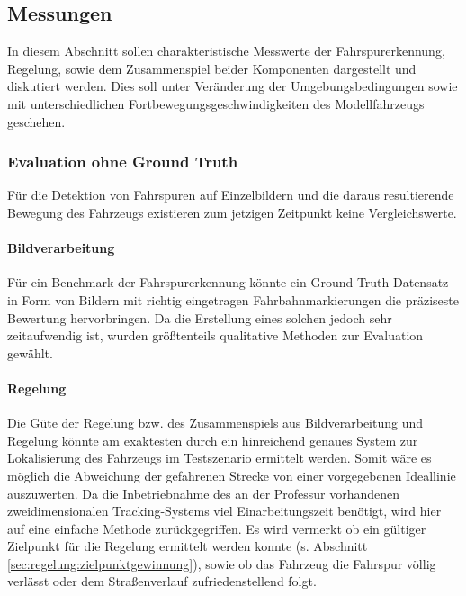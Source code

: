 \subsection{Messungen}
In diesem Abschnitt sollen charakteristische Messwerte der Fahrspurerkennung, Regelung, sowie dem Zusammenspiel beider Komponenten dargestellt und diskutiert werden. Dies soll unter Veränderung der Umgebungsbedingungen sowie mit unterschiedlichen Fortbewegungsgeschwindigkeiten des Modellfahrzeugs geschehen.
  
\subsubsection{Evaluation ohne Ground Truth}
Für die Detektion von Fahrspuren auf Einzelbildern und die daraus resultierende Bewegung des Fahrzeugs existieren zum jetzigen Zeitpunkt keine Vergleichswerte. 

\paragraph{Bildverarbeitung} 
Für ein Benchmark der Fahrspurerkennung könnte ein Ground-Truth-Datensatz in Form von Bildern mit richtig eingetragen Fahrbahnmarkierungen die präziseste Bewertung hervorbringen. Da die Erstellung eines solchen jedoch sehr zeitaufwendig ist, wurden größtenteils qualitative Methoden zur Evaluation gewählt.



\paragraph{Regelung} 
Die Güte der Regelung bzw. des Zusammenspiels aus Bildverarbeitung und Regelung könnte am exaktesten durch ein hinreichend genaues System zur Lokalisierung des Fahrzeugs im Testszenario ermittelt werden. Somit wäre es möglich die Abweichung der gefahrenen Strecke von einer vorgegebenen Ideallinie auszuwerten. Da die Inbetriebnahme des an der Professur vorhandenen zweidimensionalen Tracking-Systems viel Einarbeitungszeit benötigt, wird hier auf eine einfache Methode zurückgegriffen. Es wird vermerkt ob ein gültiger Zielpunkt für die Regelung ermittelt werden konnte (s. Abschnitt \ref{sec:regelung:zielpunktgewinnung}), sowie ob das Fahrzeug die Fahrspur völlig verlässt oder dem Straßenverlauf zufriedenstellend folgt.


